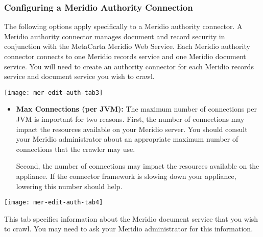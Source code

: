 %
%

\subsubsection{Configuring a Meridio Authority Connection}

The following options apply specifically to a Meridio authority
connector.  A Meridio authority connector manages document and record
security in conjunction with the MetaCarta Meridio Web Service. Each
Meridio authority connector connects to one Meridio records service and
one Meridio document service. You will need to create an authority
connector for each Meridio records service and document service you wish
to crawl.

\texttt{[image: mer-edit-auth-tab3]}

\begin{itemize}

\item \textbf{Max Connections (per JVM):} The maximum number of
connections per JVM is important for two reasons.
\ifCombinedConnectorGuide \label{max-auth}\fi First, the number of
connections may impact the resources available on your Meridio
server. You should consult your Meridio administrator about an
appropriate maximum number of connections that the crawler may use.

Second, the number of connections may impact the resources available
on the appliance. If the connector framework is slowing down your
appliance, lowering this number should help.

\end{itemize}

\texttt{[image: mer-edit-auth-tab4]}

This tab specifies information about the Meridio document service that
you wish to crawl. You may need to ask your Meridio administrator for
this information.

